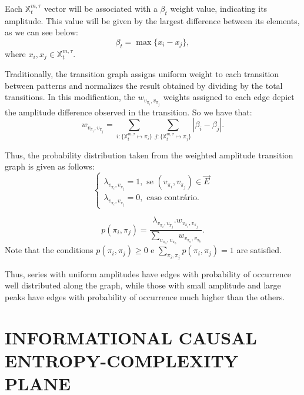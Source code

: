 \documentclass{isprs}
\begin{document}
	Each $\mathbb{X}^{m, \tau}_t$ vector will be associated with a $\beta_t$ weight value, indicating its amplitude.
	This value will be given by the largest difference between its elements, as we can see below:
	\begin{equation}
	\beta_t = \max\{x_i - x_j\},
	\end{equation}
	where $x_i, x_j \in \mathbb{X}^{m, \tau}_t$.
	
	Traditionally, the transition graph assigns uniform weight to each transition between patterns and normalizes the result obtained by dividing by the total transitions.
	In this modification, the $w_{v_{\pi_i}, v_{\pi_j}}$ weights assigned to each edge depict the amplitude difference observed in the transition.
	So we have that:	
	\begin{equation}
	w_{v_{\pi_i}, v_{\pi_j}} =  \sum_{i : \{\mathbb{X}^{m,\tau}_t \mapsto \pi_i\}} \sum_{j : \{\mathbb{X}^{m,\tau}_t \mapsto \pi_j\}} |\beta_i - \beta_j| .
	\end{equation}
	
	Thus, the probability distribution taken from the weighted amplitude transition graph is given as follows:	
	\begin{equation}
	\left\{\begin{array}{l}
	\lambda_{v_{\pi_i}, v_{\pi_j}} = 1, \text{ se } (v_{\pi_i}, v_{\pi_j}) \in \vec{E} \\
	\lambda_{v_{\pi_i}, v_{\pi_j}} = 0, \text{ caso contrário}.
	\end{array}\right.
	\end{equation}
	
	\begin{equation}
	p(\pi_i, \pi_j) = \frac{\lambda_{v_{\pi_i}, v_{\pi_j}} . w_{v_{\pi_i}, v_{\pi_j}}}{\sum_{v_{\pi_a}, v_{\pi_b}} w_{v_{\pi_a}, v_{\pi_b}}}.
	\end{equation}	
	Note that the conditions $p(\pi_i, \pi_j) \ge 0$ e $\sum_{\pi_i, \pi_j} p(\pi_i, \pi_j) = 1$ are satisfied.
	
	Thus, series with uniform amplitudes have edges with probability of occurrence well distributed along the graph, while those with small amplitude and large peaks have edges with probability of occurrence much higher than the others.
	
	\section{INFORMATIONAL CAUSAL ENTROPY-COMPLEXITY PLANE}\label{HC}
	
\end{document}
